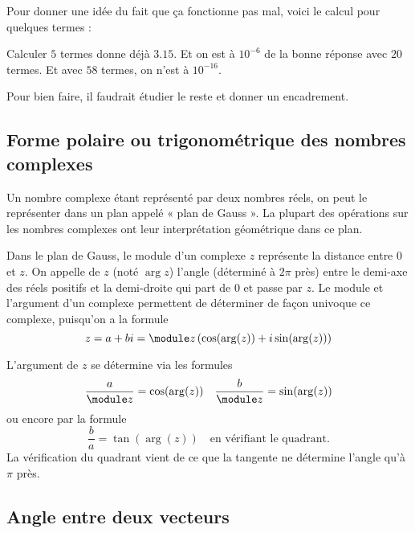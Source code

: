 Pour donner une idée du fait que ça fonctionne pas mal, voici le calcul pour quelques termes :

Calculer \( 5\) termes donne déjà \( 3.15\). Et on est à \( 10^{-6}\) de la bonne réponse avec \( 20\) termes. Et avec \( 58\) termes, on n'est à \( 10^{-16}\).

\begin{probleme}
	Pour bien faire, il faudrait étudier le reste et donner un encadrement.
\end{probleme}

\subsection[Forme trigonométrique des nombres complexes]{Forme polaire ou trigonométrique des nombres complexes}

Un nombre complexe étant représenté par deux nombres réels, on peut le représenter dans un plan appelé « plan de Gauss ». La plupart des opérations sur les nombres complexes ont leur interprétation géométrique dans ce plan.

Dans le plan de Gauss, le module d'un complexe \( z\) représente la distance entre \( 0\) et \( z\). On appelle  de \( z\) (noté \( \arg z\)) l'angle (déterminé à \( 2\pi\) près) entre le demi-axe des réels positifs et la demi-droite qui part de \( 0\) et passe par \( z\). Le module et l'argument d'un complexe permettent de déterminer de façon univoque ce complexe, puisqu'on a la formule
\[z = a + bi = \module z \left( \cos(\arg(z)) + i \sin(\arg(z)) \right)\]

L'argument de \( z\) se détermine via les formules
\[\frac a {\module z} = \cos(\arg(z)) \quad \frac b {\module z} = \sin(\arg(z))\]
ou encore par la formule
\[
	\frac b a = \tan(\arg(z)) \quad \text{en vérifiant le quadrant.}
\]
La vérification du quadrant vient de ce que la tangente ne détermine l'angle qu'à \( \pi\) près.

\subsection{Angle entre deux vecteurs}


